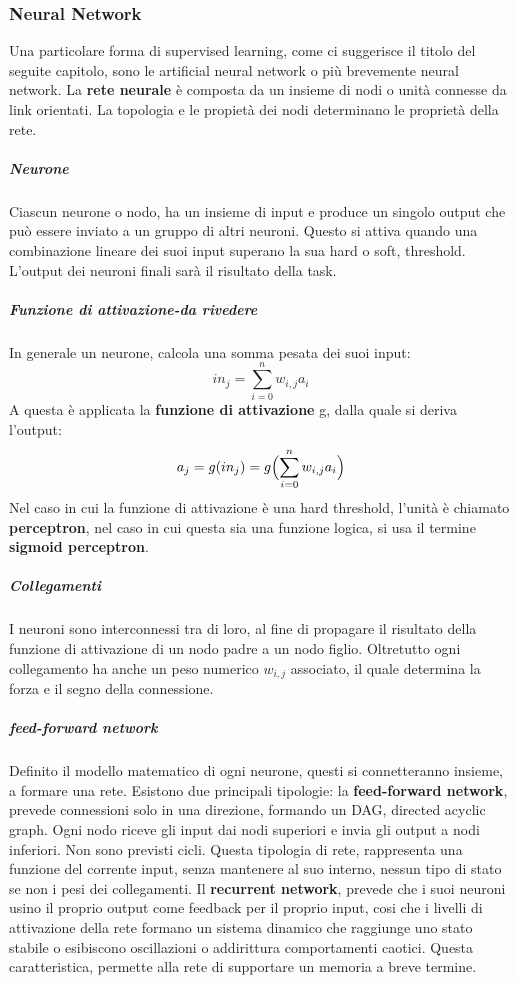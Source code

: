 \documentclass[14pt]{extarticle}
\begin{document}
\subsubsection{Neural Network}
Una particolare forma di supervised learning, come ci suggerisce il titolo del seguite capitolo, sono le artificial neural network o più brevemente neural network. 
La \textbf{rete neurale} è composta da un insieme di nodi o unità connesse da link orientati.\cite{russell2005intelligenza}
 La topologia e le propietà dei nodi determinano le proprietà della rete.
\subparagraph{Neurone}
Ciascun neurone o nodo, ha un insieme di input e produce un singolo output che può essere inviato a un gruppo di altri neuroni. Questo si attiva quando una combinazione lineare dei suoi input superano la sua hard o soft, threshold. L'output dei neuroni finali sarà il risultato della task.
\subparagraph{Funzione di attivazione-da rivedere}
In generale un neurone, calcola una somma pesata dei suoi input:
\[in_j=\sum_{i=0}^n  w_{i,j}a_{i}\]
A questa è applicata la \textbf{funzione di attivazione} g, dalla quale si deriva l'output:
\[a_j=g(in_j)=g \Bigl (\sum_{i=0}^n  w_{i,j}a_{i} \Bigr )\]
Nel caso in cui la funzione di attivazione è una hard threshold, l'unità è chiamato \textbf{perceptron}, nel caso in cui questa sia una funzione logica, si usa il termine \textbf{sigmoid perceptron}.
\subparagraph{Collegamenti}
I neuroni sono interconnessi tra di  loro,  al fine di  propagare il risultato della funzione di attivazione di un nodo padre a un nodo figlio.
 Oltretutto ogni collegamento ha anche un peso numerico $w_{i,j}$ associato, il quale determina la forza e il segno della connessione.
 
\subparagraph{feed-forward network}
Definito il modello matematico di ogni neurone, questi si connetteranno insieme, a formare una rete.
Esistono due principali tipologie: 
la \textbf{feed-forward network}, prevede connessioni solo in una direzione, formando un DAG, directed acyclic graph. Ogni nodo riceve gli input dai nodi superiori e invia gli output a nodi inferiori. Non sono previsti cicli. Questa tipologia di rete, rappresenta una funzione del corrente input, senza mantenere al suo interno, nessun tipo di stato se non i pesi dei collegamenti.
Il \textbf{recurrent network}, prevede che i suoi neuroni usino il proprio output come feedback per il proprio input, cosi che i livelli di attivazione della rete formano un sistema dinamico che raggiunge uno stato stabile o
esibiscono oscillazioni o addirittura comportamenti caotici. Questa caratteristica, permette alla rete di supportare un memoria a breve termine.

\end{document}

